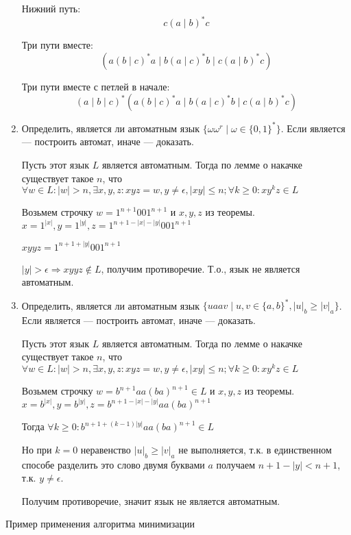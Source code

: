 \documentclass[12pt]{article}
\begin{document}
\begin{enumerate}
		Нижний путь: \[ c ( a \mid b )^* c \]
		
		Три пути вместе: \[ ( a ( b \mid c )^* a \mid b ( a \mid c )^* b \mid c ( a \mid b )^* c )\]
		
		Три пути вместе с петлей в начале:
		\[ ( a \mid b \mid c )^* ( a ( b \mid c )^* a \mid b ( a \mid c )^* b \mid c ( a \mid b )^* c ) \]
		
		\item Определить, является ли автоматным язык $\{ \omega \omega^r \mid \omega \in \{ 0, 1 \}^* \}$. Если является --- построить автомат, иначе --- доказать.
		
		Пусть этот язык $L$ является автоматным. Тогда по лемме о накачке существует такое $n$, что $\forall w \in L \colon |w| > n, \exists x, y, z: xyz=w, y \neq \epsilon, |xy| \le n; \forall k \ge 0 \colon xy^kz \in L$
		
		Возьмем строчку $w = 1^{n+1}001^{n+1}$ и $x, y, z$ из теоремы. $x = 1^{|x|}, y = 1^{|y|}, z = 1^{n+1-|x|-|y|}001^{n+1}$
		
		$xyyz = 1^{n+1+|y|}001^{n+1}$
		
		$|y| > \epsilon \Rightarrow xyyz \notin L$, получим противоречие. Т.о., язык не является автоматным.
		
		\item Определить, является ли автоматным язык $\{ u a a v \mid u, v \in \{ a, b \}^* , |u|_b \geq |v|_a \}$. Если является --- построить автомат, иначе --- доказать.
		
		Пусть этот язык $L$ является автоматным. Тогда по лемме о накачке существует такое $n$, что $\forall w \in L \colon |w| > n, \exists x, y, z: xyz=w, y \neq \epsilon, |xy| \le n; \forall k \ge 0 \colon xy^kz \in L$
		
		Возьмем строчку $w = b^{n+1}aa(ba)^{n+1} \in L$ и $x, y, z$ из теоремы. $x = b^{|x|}, y = b^{|y|}, z = b^{n+1-|x|-|y|}aa(ba)^{n+1}$
		
		Тогда $\forall k \ge 0: b^{n+1+(k-1)|y|}aa(ba)^{n+1} \in L$
		
		Но при $k=0$ неравенство $|u|_b \geq |v|_a$ не выполняется, т.к. в единственном способе разделить это слово двумя буквами $a$ получаем $n+1-|y| < n+1$, т.к. $y \neq \epsilon$.
		
		Получим противоречие, значит язык не является автоматным.
		
	\end{enumerate}
	
	\newpage
	
	\begin{center}
		\Large{Пример применения алгоритма минимизации}
	\end{center}
	
\end{document}
